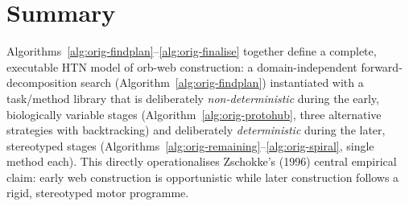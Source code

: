 \section{Summary}
\label{sec:orig-summary}

Algorithms~\ref{alg:orig-findplan}--\ref{alg:orig-finalise} together define a complete, executable HTN model of orb-web construction: a domain-independent forward-decomposition search (Algorithm~\ref{alg:orig-findplan}) instantiated with a task/method library that is deliberately \textit{non-deterministic} during the early, biologically variable stages (Algorithm~\ref{alg:orig-protohub}, three alternative strategies with backtracking) and deliberately \textit{deterministic} during the later, stereotyped stages (Algorithms~\ref{alg:orig-remaining}--\ref{alg:orig-spiral}, single method each). This directly operationalises Zschokke's (1996) central empirical claim: early web construction is opportunistic while later construction follows a rigid, stereotyped motor programme.
